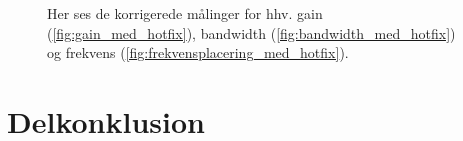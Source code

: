 \begin{figure}[h!]
	\centering
  	\caption{Her ses de korrigerede målinger for hhv. gain (\ref{fig:gain_med_hotfix}), bandwidth (\ref{fig:bandwidth_med_hotfix}) og frekvens (\ref{fig:frekvensplacering_med_hotfix}).}
	\label{fig:korr}
\end{figure}

\section{Delkonklusion}




